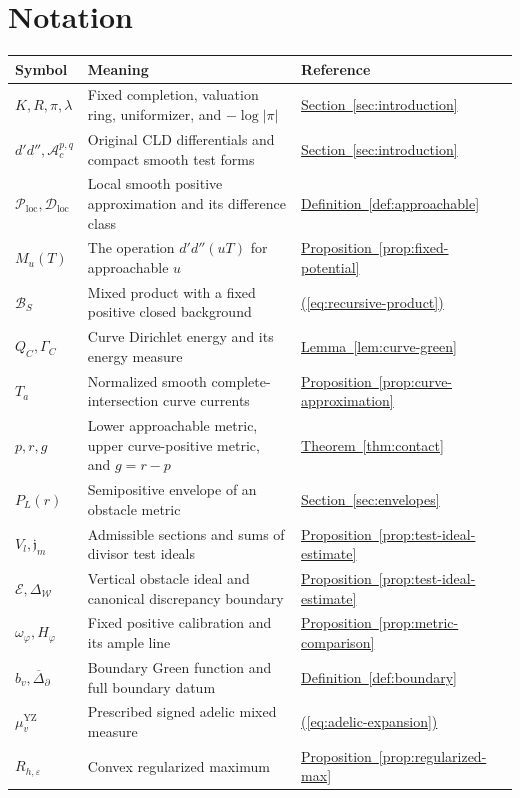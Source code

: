 \documentclass[11pt]{amsart}
\theoremstyle{definition}
\theoremstyle{remark}
\numberwithin{equation}{section}
\newcommand{\ddc}{d'd''}
\newcommand{\Ploc}{\mathcal P_{\mathrm{loc}}}
\newcommand{\Dloc}{\mathcal D_{\mathrm{loc}}}
\newcommand{\Ac}{\mathcal A_c}
\newcommand{\cW}{\mathscr W}
\newcommand{\cE}{\mathscr E}
\newcommand{\namedref}[2]{%
 \begingroup
 \ifstrequal{#1}{Section}{\hypersetup{linkcolor=sectionteal}}{%
  \ifstrequal{#1}{Appendix}{\hypersetup{linkcolor=sectionteal}}{}}%
 \hyperref[#2]{#1~\ref*{#2}}%
 \endgroup}
\renewcommand{\eqref}[1]{%
 \begingroup\hypersetup{linkcolor=equationviolet}%
 \hyperref[#1]{\textup{(\ref*{#1})}}%
 \endgroup}
\begin{document}
\section*{Notation}
\renewcommand{\arraystretch}{1.06}
\begin{longtable}{@{}>{\raggedright\arraybackslash}p{}>{\raggedright\arraybackslash}p{}>{\raggedright\arraybackslash}p{}@{}}
\toprule
Symbol & Meaning & Reference\\
\midrule
\endhead
\(K,R,\pi,\lambda\)& Fixed completion, valuation ring, uniformizer,
and \(-\log|\pi|\)&\namedref{Section}{sec:introduction}\\
\(\ddc,\Ac^{p,q}\)& Original CLD differentials and compact smooth
test forms&\namedref{Section}{sec:introduction}\\
\(\Ploc,\Dloc\)& Local smooth positive approximation and its
difference class&\namedref{Definition}{def:approachable}\\
\(M_u(T)\)& The operation \(\ddc(uT)\) for approachable \(u\)&
\namedref{Proposition}{prop:fixed-potential}\\
\(\mathcal B_S\)& Mixed product with a fixed positive closed
background&\eqref{eq:recursive-product}\\
\(Q_C,\Gamma_C\)& Curve Dirichlet energy and its energy measure&
\namedref{Lemma}{lem:curve-green}\\
\(T_a\)& Normalized smooth complete-intersection curve currents&
\namedref{Proposition}{prop:curve-approximation}\\
\(p,r,g\)& Lower approachable metric, upper curve-positive metric,
and \(g=r-p\)&\namedref{Theorem}{thm:contact}\\
\(P_L(r)\)& Semipositive envelope of an obstacle metric&
\namedref{Section}{sec:envelopes}\\
\(V_l,\mathfrak j_m\)& Admissible sections and sums of divisor test ideals&
\namedref{Proposition}{prop:test-ideal-estimate}\\
\(\cE,\Delta_{\cW}\)& Vertical obstacle ideal and canonical
discrepancy boundary&\namedref{Proposition}{prop:test-ideal-estimate}\\
\(\omega_\varphi,H_\varphi\)& Fixed positive calibration and its ample line&
\namedref{Proposition}{prop:metric-comparison}\\
\(b_v,\overline\Delta_\partial\)& Boundary Green function and full
boundary datum&\namedref{Definition}{def:boundary}\\
\(\mu_v^{\mathrm{YZ}}\)& Prescribed signed adelic mixed measure&
\eqref{eq:adelic-expansion}\\
\(R_{h,\varepsilon}\)& Convex regularized maximum&
\namedref{Proposition}{prop:regularized-max}\\
\bottomrule
\end{longtable}
\end{document}
